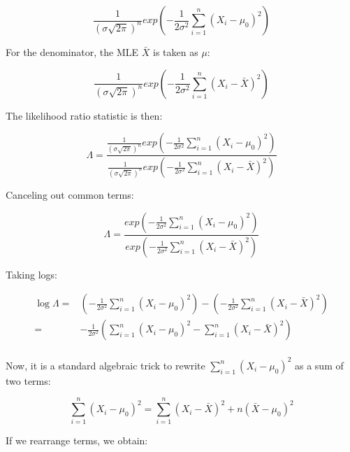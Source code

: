 \documentclass[12pt,]{krantz}
\begin{document}
\begin{equation}
\frac{1}{(\sigma\sqrt{2\pi})^n} 
           exp\left( -\frac{1}{2\sigma^2} \sum_{i=1}^n (X_i - \mu_0)^2  \right)
\end{equation}

For the denominator, the MLE \(\bar{X}\) is taken as \(\mu\):

\begin{equation}
\frac{1}{(\sigma\sqrt{2\pi})^n} exp \left( -\frac{1}{2\sigma^2} \sum_{i=1}^n (X_i - \bar{X})^2 \right)
\end{equation}

The likelihood ratio statistic is then:

\begin{equation}
\Lambda = 
\frac{\frac{1}{(\sigma\sqrt{2\pi})^n} 
           exp\left( -\frac{1}{2\sigma^2} \sum_{i=1}^n (X_i - \mu_0)^2  \right)}{\frac{1}{(\sigma\sqrt{2\pi})^n} 
           exp\left( -\frac{1}{2\sigma^2} \sum_{i=1}^n (X_i - \bar{X})^2  \right)}
\end{equation}

Canceling out common terms:

\begin{equation}
\Lambda = 
\frac{exp\left( -\frac{1}{2\sigma^2} \sum_{i=1}^n (X_i - \mu_0)^2  \right)}{
        exp\left( -\frac{1}{2\sigma^2} \sum_{i=1}^n (X_i - \bar{X})^2  \right)}
\end{equation}

Taking logs:

\begin{equation}
\begin{split}
\log \Lambda =& 
\left( -\frac{1}{2\sigma^2} \sum_{i=1}^n (X_i - \mu_0)^2  \right)-\left( -\frac{1}{2\sigma^2} \sum_{i=1}^n (X_i - \bar{X})^2  \right)\\
=& -\frac{1}{2\sigma^2} \left( \sum_{i=1}^n (X_i - \mu_0)^2  -  \sum_{i=1}^n (X_i - \bar{X})^2 \right)\\
\end{split}
\end{equation}

Now, it is a standard algebraic trick to rewrite \(\sum_{i=1}^n (X_i -\mu_0)^2\) as a sum of two terms:

\begin{equation}
\sum_{i=1}^n (X_i -\mu_0)^2 = \sum_{i=1}^n (X_i - \bar{X})^2 + n(\bar{X} - \mu_0)^2 
\end{equation}

If we rearrange terms, we obtain:
\end{document}
